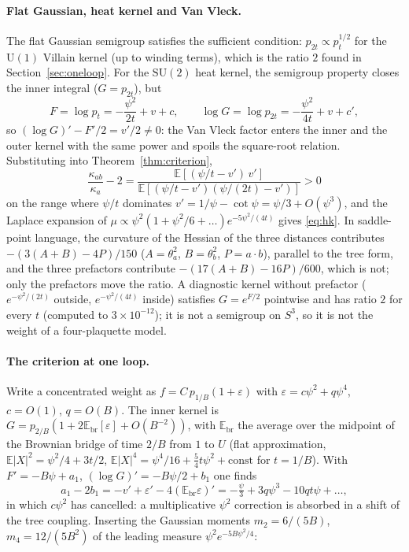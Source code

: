 \documentclass[11pt,a4paper]{article}
\theoremstyle{definition}
\theoremstyle{remark}
\newcommand{\E}{\mathbb{E}}
\newcommand{\SU}{\mathrm{SU}(2)}
\begin{document}
\paragraph{Flat Gaussian, heat kernel and Van Vleck.}
The flat Gaussian semigroup satisfies the sufficient condition: $p_{2t}\propto p_t^{1/2}$ for the $\mathrm{U}(1)$ Villain kernel (up to winding terms), which is the ratio $2$ found in Section~\ref{sec:oneloop}.
For the $\SU$ heat kernel, the semigroup property closes the inner integral ($G=p_{2t}$), but
\[
F=\log p_t=-\frac{\psi^2}{2t}+v+c,\qquad \log G=\log p_{2t}=-\frac{\psi^2}{4t}+v+c',
\]
so $(\log G)'-F'/2=v'/2\ne0$: the Van Vleck factor enters the inner and the outer kernel with the same power and spoils the square-root relation.
Substituting into Theorem~\ref{thm:criterion},
\[
\frac{\kappa_{ab}}{\kappa_a}-2=\frac{\E[(\psi/t-v')\,v']}{\E[(\psi/t-v')(\psi/(2t)-v')]}>0
\]
on the range where $\psi/t$ dominates $v'=1/\psi-\cot\psi=\psi/3+O(\psi^3)$, and the Laplace expansion of $\mu\propto\psi^2(1+\psi^2/6+\dots)e^{-5\psi^2/(4t)}$ gives \eqref{eq:hk}.
In saddle-point language, the curvature of the Hessian of the three distances contributes $-(3(A+B)-4P)/150$ ($A=\theta_a^2$, $B=\theta_b^2$, $P=a\cdot b$), parallel to the tree form, and the three prefactors contribute $-(17(A+B)-16P)/600$, which is not; only the prefactors move the ratio.
A diagnostic kernel without prefactor ($e^{-\psi^2/(2t)}$ outside, $e^{-\psi^2/(4t)}$ inside) satisfies $G=e^{F/2}$ pointwise and has ratio $2$ for every $t$ (computed to $3\times10^{-12}$); it is not a semigroup on $S^3$, so it is not the weight of a four-plaquette model.

\paragraph{The criterion at one loop.}
Write a concentrated weight as $f=C\,p_{1/B}(1+\varepsilon)$ with $\varepsilon=c\psi^2+q\psi^4$, $c=O(1)$, $q=O(B)$.
The inner kernel is $G=p_{2/B}(1+2\E_{\mathrm{br}}[\varepsilon]+O(B^{-2}))$, with $\E_{\mathrm{br}}$ the average over the midpoint of the Brownian bridge of time $2/B$ from $1$ to $U$ (flat approximation, $\E|X|^2=\psi^2/4+3t/2$, $\E|X|^4=\psi^4/16+\tfrac54t\psi^2+\mathrm{const}$ for $t=1/B$).
With $F'=-B\psi+a_1$, $(\log G)'=-B\psi/2+b_1$ one finds
\[
a_1-2b_1=-v'+\varepsilon'-4(\E_{\mathrm{br}}\varepsilon)'=-\tfrac{\psi}{3}+3q\psi^3-10qt\psi+\dots,
\]
in which $c\psi^2$ has cancelled: a multiplicative $\psi^2$ correction is absorbed in a shift of the tree coupling.
Inserting the Gaussian moments $m_2=6/(5B)$, $m_4=12/(5B^2)$ of the leading measure $\psi^2e^{-5B\psi^2/4}$:
\end{document}
